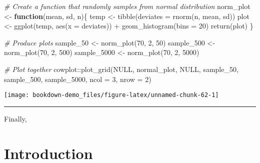 \documentclass[
]{book}
\newenvironment{Shaded}{\begin{snugshade}}{\end{snugshade}}
\newcommand{\AttributeTok}[1]{\textcolor[rgb]{0.77,0.63,0.00}{#1}}
\newcommand{\CommentTok}[1]{\textcolor[rgb]{0.56,0.35,0.01}{\textit{#1}}}
\newcommand{\ConstantTok}[1]{\textcolor[rgb]{0.00,0.00,0.00}{#1}}
\newcommand{\ControlFlowTok}[1]{\textcolor[rgb]{0.13,0.29,0.53}{\textbf{#1}}}
\newcommand{\DecValTok}[1]{\textcolor[rgb]{0.00,0.00,0.81}{#1}}
\newcommand{\FunctionTok}[1]{\textcolor[rgb]{0.00,0.00,0.00}{#1}}
\newcommand{\NormalTok}[1]{#1}
\newcommand{\OtherTok}[1]{\textcolor[rgb]{0.56,0.35,0.01}{#1}}
\newcommand{\SpecialCharTok}[1]{\textcolor[rgb]{0.00,0.00,0.00}{#1}}
\begin{document}
\begin{Shaded}
\begin{Highlighting}[]
\CommentTok{\# Create a function that randomly samples from normal distribution}
\NormalTok{norm\_plot }\OtherTok{\textless{}{-}} \ControlFlowTok{function}\NormalTok{(mean, sd, n)\{}
\NormalTok{  temp }\OtherTok{\textless{}{-}} \FunctionTok{tibble}\NormalTok{(}\AttributeTok{deviates =} \FunctionTok{rnorm}\NormalTok{(n, mean, sd))}
\NormalTok{  plot }\OtherTok{\textless{}{-}} \FunctionTok{ggplot}\NormalTok{(temp, }\FunctionTok{aes}\NormalTok{(}\AttributeTok{x =}\NormalTok{ deviates)) }\SpecialCharTok{+}
    \FunctionTok{geom\_histogram}\NormalTok{(}\AttributeTok{bins =} \DecValTok{20}\NormalTok{)}
  \FunctionTok{return}\NormalTok{(plot)}
\NormalTok{\}}

\CommentTok{\# Produce plots}
\NormalTok{sample\_50 }\OtherTok{\textless{}{-}} \FunctionTok{norm\_plot}\NormalTok{(}\DecValTok{70}\NormalTok{, }\DecValTok{2}\NormalTok{, }\DecValTok{50}\NormalTok{)}
\NormalTok{sample\_500 }\OtherTok{\textless{}{-}} \FunctionTok{norm\_plot}\NormalTok{(}\DecValTok{70}\NormalTok{, }\DecValTok{2}\NormalTok{, }\DecValTok{500}\NormalTok{)}
\NormalTok{sample\_5000 }\OtherTok{\textless{}{-}} \FunctionTok{norm\_plot}\NormalTok{(}\DecValTok{70}\NormalTok{, }\DecValTok{2}\NormalTok{, }\DecValTok{5000}\NormalTok{)}

\CommentTok{\# Plot together}
\NormalTok{cowplot}\SpecialCharTok{::}\FunctionTok{plot\_grid}\NormalTok{(}\ConstantTok{NULL}\NormalTok{, normal\_plot, }\ConstantTok{NULL}\NormalTok{, sample\_50, sample\_500, sample\_5000, }\AttributeTok{ncol =} \DecValTok{3}\NormalTok{, }\AttributeTok{nrow =} \DecValTok{2}\NormalTok{)}
\end{Highlighting}
\end{Shaded}

\begin{center}\texttt{[image: bookdown-demo\_files/figure-latex/unnamed-chunk-62-1]} \end{center}

\begin{center}\rule{0.5\linewidth}{0.5pt}\end{center}

Finally,

\hypertarget{introduction-1}{%
\section{Introduction}\label{introduction-1}}
\end{document}
